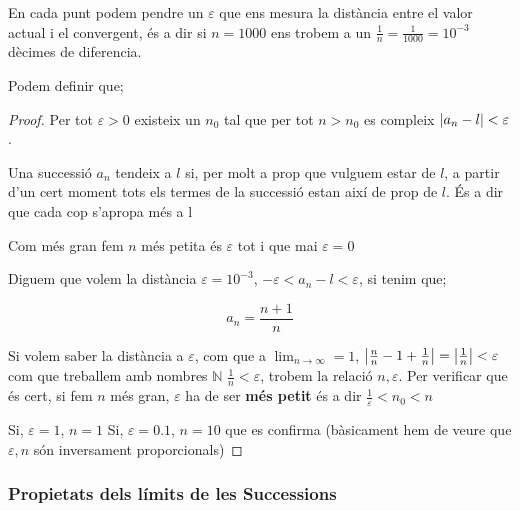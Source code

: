 \documentclass[12pt]{article}
\newcommand{\N}{\mathbb{N}}
\begin{document}
En cada punt podem pendre un $\varepsilon$ que ens mesura la distància entre el valor actual i el convergent, és a dir si $n = 1000$ ens trobem a un $\frac{1}{n} = \frac{1}{1000} = 10^{-3}$ dècimes de diferencia.

Podem definir que;

\begin{proof}
    Per tot $\varepsilon > 0 $ existeix un $n_0$ tal que per tot $n>n_0$ es compleix $\abs{a_n - l} < \varepsilon$.

    Una successió \(a_n\) tendeix a \(l\) si, per molt a prop que vulguem estar de \(l\), a partir d'un cert moment tots els termes de la successió estan així de prop de \(l\). És a dir que cada cop s'apropa més a l

    Com més gran fem $n$ més petita és $\varepsilon$ tot i que mai $\varepsilon = 0$

    Diguem que volem la distància $\varepsilon = 10^{-3}$, $-\varepsilon < a_n - l < \varepsilon$, si tenim que;

    \[a_n = \frac{n+1}{n}\]

    Si volem saber la distància a $\varepsilon$, com que a $\lim_{n\rightarrow \infty} = 1$, $\abs{\frac{n}{n} - 1 + \frac{1}{n}} = \abs{\frac{1}{n}} < \varepsilon$ com que treballem amb nombres $\N$ $\frac{1}{n}<\varepsilon$, trobem la relació $n, \varepsilon$. Per verificar que és cert, si fem $n$ més gran, $\varepsilon$ ha de ser \textbf{més petit} és a dir $\frac{1}{\varepsilon} < n_0 < n$

    Si, $\varepsilon = 1$, $n = 1$
    Si, $\varepsilon = 0.1$, $n = 10$ que es confirma (bàsicament hem de veure que $\varepsilon, n$ són inversament proporcionals)
\end{proof}

\subsubsection{Propietats dels límits de les Successions}
\end{document}
